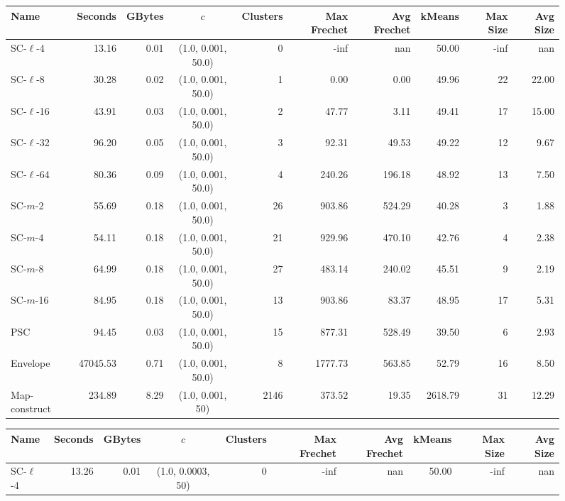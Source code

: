 \documentclass[11pt]{article}
\begin{document}
\begin{figure} \begin{center}
    \begin{minipage}{\textwidth}
    {
    \begin{tabular}{@{}lrrcrrrrrr@{}}
        \toprule
        Name & Seconds & GBytes & $c$ & Clusters & Max Frechet & Avg Frechet & kMeans & Max Size & Avg Size\\
        \midrule
        SC-$\ell$-4 & 13.16 & 0.01 & (1.0, 0.001, 50.0) & 0 & -inf & nan & 50.00 & -inf & nan\\
        SC-$\ell$-8 & 30.28 & 0.02 & (1.0, 0.001, 50.0) & 1 & 0.00 & 0.00 & 49.96 & 22 & 22.00\\
        SC-$\ell$-16 & 43.91 & 0.03 & (1.0, 0.001, 50.0) & 2 & 47.77 & 3.11 & 49.41 & 17 & 15.00\\
        SC-$\ell$-32 & 96.20 & 0.05 & (1.0, 0.001, 50.0) & 3 & 92.31 & 49.53 & 49.22 & 12 & 9.67\\
        SC-$\ell$-64 & 80.36 & 0.09 & (1.0, 0.001, 50.0) & 4 & 240.26 & 196.18 & 48.92 & 13 & 7.50\\
        SC-$m$-2 & 55.69 & 0.18 & (1.0, 0.001, 50.0) & 26 & 903.86 & 524.29 & 40.28 & 3 & 1.88\\
        SC-$m$-4 & 54.11 & 0.18 & (1.0, 0.001, 50.0) & 21 & 929.96 & 470.10 & 42.76 & 4 & 2.38\\
        SC-$m$-8 & 64.99 & 0.18 & (1.0, 0.001, 50.0) & 27 & 483.14 & 240.02 & 45.51 & 9 & 2.19\\
        SC-$m$-16 & 84.95 & 0.18 & (1.0, 0.001, 50.0) & 13 & 903.86 & 83.37 & 48.95 & 17 & 5.31\\
        PSC & 94.45 & 0.03 & (1.0, 0.001, 50.0) & 15 & 877.31 & 528.49 & 39.50 & 6 & 2.93\\
        Envelope & 47045.53 & 0.71 & (1.0, 0.001, 50.0) & 8 & 1777.73 & 563.85 & 52.79 & 16 & 8.50\\
        Map-construct & 234.89 & 8.29 & (1.0, 0.001, 50) & 2146 & 373.52 & 19.35 & 2618.79 & 31 & 12.29\\
        \bottomrule
    \end{tabular}
    }
    {
    \begin{tabular}{@{}lrrcrrrrrr@{}}
        \toprule
        Name & Seconds & GBytes & $c$ & Clusters & Max Frechet & Avg Frechet & kMeans & Max Size & Avg Size\\
        \midrule
        SC-$\ell$-4 & 13.26 & 0.01 & (1.0, 0.0003, 50) & 0 & -inf & nan & 50.00 & -inf & nan\\

\end{tabular}}
\end{minipage}
\end{center}
\end{figure}
\end{document}

